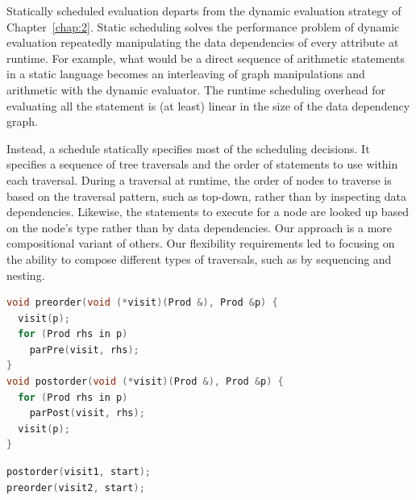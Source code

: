Statically scheduled evaluation departs from the dynamic evaluation strategy of Chapter~\ref{chap:2}. Static scheduling solves the performance problem of dynamic evaluation repeatedly manipulating the data dependencies of every attribute at runtime. For example, what would be a direct sequence of arithmetic statements in a static language becomes an interleaving of graph manipulations and arithmetic with the dynamic evaluator. The runtime scheduling overhead for evaluating all the statement is (at least) linear in the size of the data dependency graph. 

Instead, a schedule statically specifies most of the scheduling decisions.  It specifies a sequence of tree traversals and the order of statements to use within each traversal. During a traversal at runtime, the order of nodes to traverse is based on the traversal pattern, such as top-down, rather than by inspecting data dependencies. Likewise, the statements to execute for a node are looked up based on the node's type rather than by data dependencies.  Our approach is a more compositional variant of others. Our flexibility requirements led to focusing on the ability to compose different types of traversals, such as by sequencing and nesting.






\newsavebox{\seqtraversals}
\begin{lrbox}{\seqtraversals}%
\begin{minipage}{1\columnwidth}
\begin{lstlisting}[mathescape,language=C++,morekeywords={spawn,join}]
void preorder(void (*visit)(Prod &), Prod &p) {
  visit(p);
  for (Prod rhs in p) 
    parPre(visit, rhs);
}
void postorder(void (*visit)(Prod &), Prod &p) {
  for (Prod rhs in p) 
    parPost(visit, rhs);
  visit(p);
}
\end{lstlisting}
\end{minipage}
\end{lrbox}

\newsavebox{\seqtraversalsequence}
\begin{lrbox}{\seqtraversalsequence}%
\begin{minipage}{1\columnwidth}
\begin{lstlisting}[mathescape,language=C++,morekeywords={spawn,join}]
postorder(visit1, start); 
preorder(visit2, start);
\end{lstlisting}
\end{minipage}
\end{lrbox}


